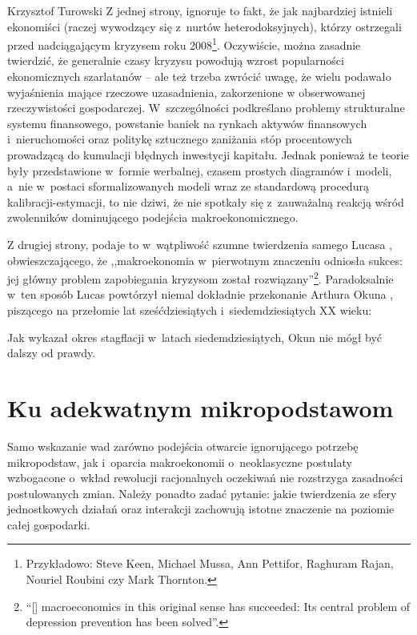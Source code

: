 \begin{artplenv}{Krzysztof Turowski}
Z jednej strony, ignoruje to fakt, że jak najbardziej istnieli ekonomiści (raczej wywodzący się z~nurtów
heterodoksyjnych), którzy ostrzegali przed nadciągającym kryzysem roku 2008\footnote{Przykładowo: Steve Keen, Michael
Mussa, Ann Pettifor, Raghuram Rajan, Nouriel Roubini czy Mark Thornton.}. Oczywiście, można zasadnie twierdzić, że
generalnie czasy kryzysu powodują wzrost popularności ekonomicznych szarlatanów
\parencite{robinson_second_1972}
 --  ale też trzeba zwrócić uwagę, że wielu podawało wyjaśnienia mające rzeczowe uzasadnienia, zakorzenione
w obserwowanej rzeczywistości gospodarczej. W~szczególności podkreślano problemy strukturalne systemu finansowego,
powstanie baniek na rynkach aktywów finansowych i~nieruchomości oraz politykę sztucznego zaniżania stóp procentowych
prowadzącą do kumulacji błędnych inwestycji kapitału. Jednak ponieważ te teorie były przedstawione w~formie werbalnej,
czasem prostych diagramów i~modeli, a~nie w~postaci sformalizowanych modeli wraz ze standardową procedurą
kalibracji-estymacji, to nie dziwi, że nie spotkały się z~zauważalną reakcją wśród zwolenników dominującego podejścia
makroekonomicznego.

Z drugiej strony, podaje to w~wątpliwość szumne twierdzenia samego Lucasa
\parencite[s.~1]{lucas_macroeconomic_2003},
obwieszczającego, że ,,makroekonomia w~pierwotnym znaczeniu odniosła sukces: jej główny problem zapobiegania kryzysom
został rozwiązany''\footnote{``[\mydots] macroeconomics in this original sense has succeeded: Its central problem of depression
prevention has been solved''.}. Paradoksalnie w~ten sposób Lucas powtórzył niemal dokładnie przekonanie Arthura Okuna
\parencite*{okun_political_1970},
piszącego na przełomie lat sześćdziesiątych i~siedemdziesiątych XX wieku:


Jak wykazał okres stagflacji w~latach siedemdziesiątych, Okun nie mógł być dalszy od prawdy.

\section{Ku adekwatnym mikropodstawom}
Samo wskazanie wad zarówno podejścia otwarcie ignorującego potrzebę mikropodstaw, jak i~oparcia
makroekonomii o~neoklasyczne postulaty wzbogacone o~wkład rewolucji racjonalnych oczekiwań nie rozstrzyga zasadności postulowanych
zmian. Należy ponadto zadać pytanie: jakie twierdzenia ze sfery jednostkowych działań oraz interakcji zachowują istotne
znaczenie na poziomie całej gospodarki.


\end{artplenv}

